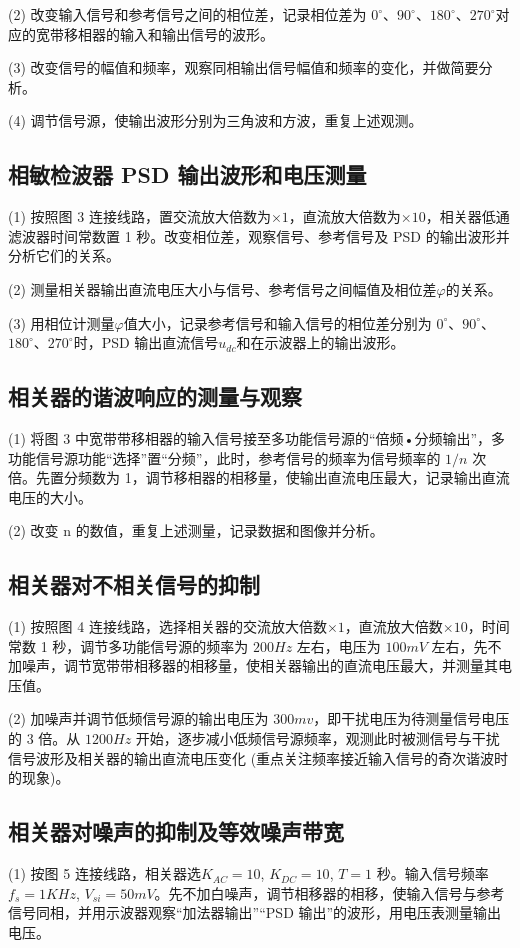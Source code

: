 \documentclass{whureport}
\begin{document}
\begin{multicols}{2}
(2) 改变输入信号和参考信号之间的相位差，记录相位差为 $0^\circ$、$90^\circ$、$180^\circ$、$270^\circ$对应的宽带移相器的输入和输出信号的波形。

(3) 改变信号的幅值和频率，观察同相输出信号幅值和频率的变化，并做简要分析。

(4) 调节信号源，使输出波形分别为三角波和方波，重复上述观测。

\subsection{相敏检波器 PSD 输出波形和电压测量}
(1) 按照图 3 连接线路，置交流放大倍数为$\times1$，直流放大倍数为$\times10$，相关器低通滤波器时间常数置 1 秒。改变相位差，观察信号、参考信号及 PSD 的输出波形并分析它们的关系。

(2) 测量相关器输出直流电压大小与信号、参考信号之间幅值及相位差$\varphi$的关系。

(3) 用相位计测量$\varphi$值大小，记录参考信号和输入信号的相位差分别为 $0^\circ$、$90^\circ$、$180^\circ$、$270^\circ$时，PSD 输出直流信号$u_{dc}$和在示波器上的输出波形。

\subsection{相关器的谐波响应的测量与观察}
(1) 将图 3 中宽带带移相器的输入信号接至多功能信号源的“倍频•分频输出”，多功能信号源功能“选择”置“分频”，此时，参考信号的频率为信号频率的 $1/n$ 次倍。先置分频数为 1，调节移相器的相移量，使输出直流电压最大，记录输出直流电压的大小。

(2) 改变 n 的数值，重复上述测量，记录数据和图像并分析。

\subsection{相关器对不相关信号的抑制}
(1) 按照图 4 连接线路，选择相关器的交流放大倍数$\times1$，直流放大倍数$\times10$，时间常数 1 秒，调节多功能信号源的频率为 $200Hz$ 左右，电压为 $100mV$ 左右，先不加噪声，调节宽带带相移器的相移量，使相关器输出的直流电压最大，并测量其电压值。

(2) 加噪声并调节低频信号源的输出电压为 $300mv$，即干扰电压为待测量信号电压的 3 倍。从 $1200Hz$ 开始，逐步减小低频信号源频率，观测此时被测信号与干扰信号波形及相关器的输出直流电压变化 (重点关注频率接近输入信号的奇次谐波时的现象)。

\subsection{相关器对噪声的抑制及等效噪声带宽}
(1) 按图 5 连接线路，相关器选$K_{AC} = 10$, $K_{DC} = 10$, $T = 1$ 秒。输入信号频率$f_s = 1KHz$, $V_{si} = 50mV$。先不加白噪声，调节相移器的相移，使输入信号与参考信号同相，并用示波器观察“加法器输出”“PSD 输出”的波形，用电压表测量输出电压。


\end{multicols}
\end{document}
